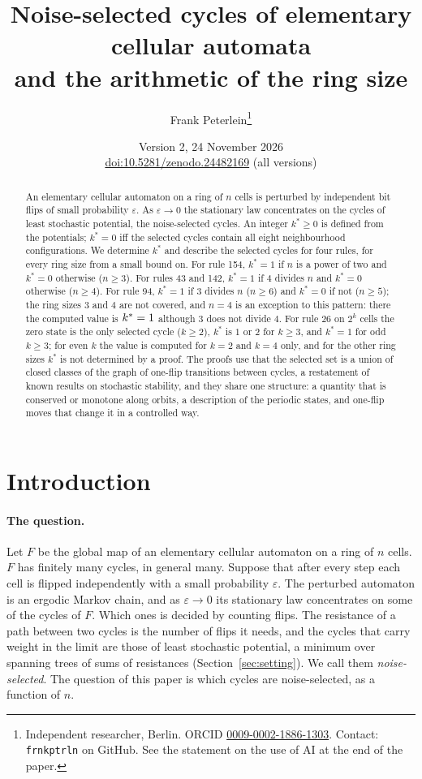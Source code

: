\documentclass[10pt,a4paper]{article}
\title{Noise-selected cycles of elementary cellular automata\\ and the arithmetic of the ring size}
\author{Frank Peterlein\thanks{Independent researcher, Berlin. ORCID
\href{https://orcid.org/0009-0002-1886-1303}{0009-0002-1886-1303}. Contact: \texttt{frnkptrln} on GitHub. See the
statement on the use of AI at the end of the paper.}}
\date{Version 2, 24 November 2026\\[4pt]\normalsize\href{https://doi.org/10.5281/zenodo.24482169}{doi:10.5281/zenodo.24482169} (all versions)}
\newcommand{\eps}{\varepsilon}
\newcommand{\kst}{k^{*}}
\begin{document}
\maketitle

\begin{abstract}
\noindent
An elementary cellular automaton on a ring of $n$ cells is perturbed by independent bit flips of small probability
$\eps$. As $\eps\to0$ the stationary law concentrates on the cycles of least stochastic potential, the
noise-selected cycles. An integer $\kst\ge0$ is defined from the potentials; $\kst=0$ iff the selected cycles
contain all eight neighbourhood configurations. We determine $\kst$ and describe the selected cycles for
four rules, for every ring size from a small bound on. For rule 154, $\kst=1$ if $n$ is a power of two and $\kst=0$
otherwise ($n\ge3$). For rules 43 and 142, $\kst=1$ if $4$ divides $n$ and $\kst=0$ otherwise ($n\ge4$). For rule 94,
$\kst=1$ if $3$ divides $n$ ($n\ge6$) and $\kst=0$ if not ($n\ge5$); the ring sizes $3$ and $4$ are not covered, and
$n=4$ is an exception to this pattern: there the computed value is $\kst=\KstarNinetyFourAtFour$ although $3$ does not
divide $4$. For rule 26 on $2^k$ cells the zero state is the only selected cycle ($k\ge2$), $\kst$ is $1$ or $2$ for
$k\ge3$, and $\kst=1$ for odd $k\ge3$; for even $k$ the value is computed for $k=2$ and $k=4$ only, and for the other
ring sizes $\kst$ is not determined by a proof. The proofs use that the
selected set is a union of closed classes of the graph of one-flip transitions between cycles, a restatement of
known results on stochastic stability, and they share one structure: a quantity that is conserved or monotone along
orbits, a description of the periodic states, and one-flip moves that change it in a controlled way.
\end{abstract}

\section{Introduction}

\paragraph{The question.}
Let $F$ be the global map of an elementary cellular automaton on a ring of $n$ cells. $F$ has finitely many cycles, in
general many. Suppose that after every step each cell is flipped independently with a small probability $\eps$. The
perturbed automaton is an ergodic Markov chain, and as $\eps\to0$ its stationary law concentrates on some of the
cycles of $F$. Which ones is decided by counting flips. The resistance of a path between two cycles is the number of
flips it needs, and the cycles that carry weight in the limit are those of least stochastic potential, a minimum
over spanning trees of sums of resistances (Section~\ref{sec:setting}). We call them \emph{noise-selected}. The
question of this paper is which cycles are noise-selected, as a function of $n$.
\end{document}
